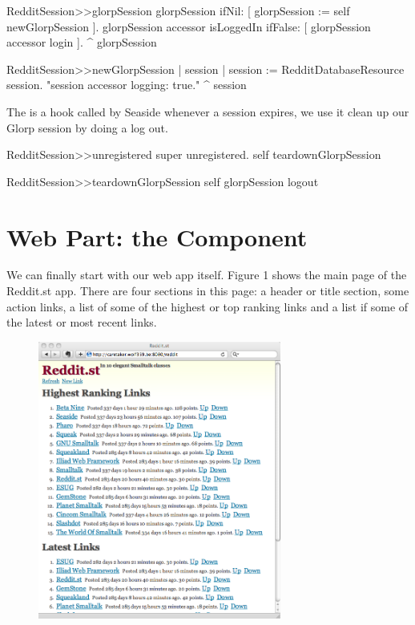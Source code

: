 \documentclass[a4paper,10pt,twoside]{book}
\begin{document}
\begin{code}{}
RedditSession>>glorpSession
   glorpSession ifNil: [ glorpSession := self newGlorpSession ]. 
   glorpSession accessor isLoggedIn ifFalse: [ glorpSession accessor login ]. 
   ^ glorpSession
\end{code}

\begin{code}{}
RedditSession>>newGlorpSession
     | session | 
     session := RedditDatabaseResource session. "session accessor logging: true." 
     ^ session
\end{code}

The  is a hook called by Seaside whenever a session expires, we use it clean up our Glorp session by doing a log out.

\begin{code}{}
RedditSession>>unregistered
     super unregistered. 
     self teardownGlorpSession
\end{code}

\begin{code}{}
RedditSession>>teardownGlorpSession
     self glorpSession logout
\end{code}

\section{Web Part: the Component }

We can finally start with our web app itself. Figure 1 shows the main page of the Reddit.st app. There are four sections in this page: a header or title section, some action links, a list of some of the highest or top ranking links and a list if some of the latest or most recent links.

\begin{figure}\begin{center}
\includegraphics[width=8cm]{redditOne}
\caption{}
\end{center}
\end{figure}
\end{document}
